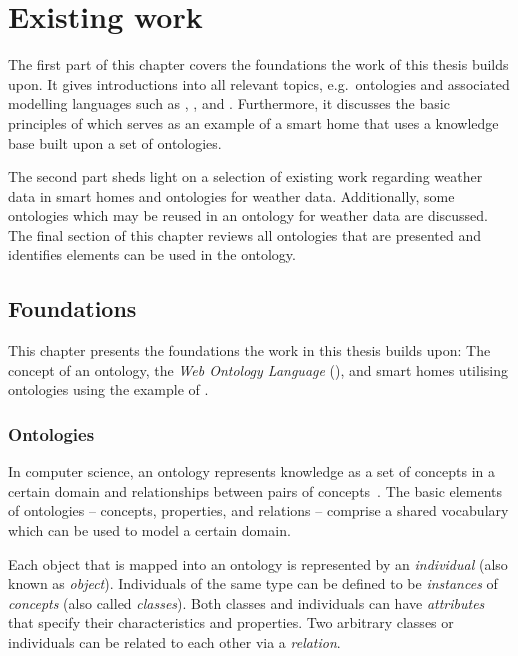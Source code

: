 \chapter{Existing work}
\label{ch:existing_work}

The first part of this chapter covers the foundations the work of this thesis builds upon. It gives introductions into all relevant topics, e.g.\ ontologies and associated modelling languages such as , , and . Furthermore, it discusses the basic principles of \thinkhome which serves as an example of a smart home that uses a knowledge base built upon a set of ontologies.

The second part sheds light on a selection of existing work regarding weather data in smart homes and ontologies for weather data. Additionally, some ontologies which may be reused in an ontology for weather data are discussed. The final section of this chapter reviews all ontologies that are presented and identifies elements can be used in the \smarthomeweather ontology.

\section{Foundations}

This chapter presents the foundations the work in this thesis builds upon: The concept of an ontology, the \emph{Web Ontology Language} (), and smart homes utilising ontologies using the example of \thinkhome.

\subsection{Ontologies}
\label{subsec:ontologies}

In computer science, an ontology represents knowledge as a set of concepts in a certain domain and relationships between pairs of concepts~\cite{OntologiesSilverBullet}. The basic elements of ontologies -- concepts, properties, and relations -- comprise a shared vocabulary which can be used to model a certain domain.

Each object that is mapped into an ontology is represented by an \emph{individual} (also known as \emph{object}). Individuals of the same type can be defined to be \emph{instances} of \emph{concepts} (also called \emph{classes}). Both classes and individuals can have \emph{attributes} that specify their characteristics and properties. Two arbitrary classes or individuals can be related to each other via a \emph{relation}.

